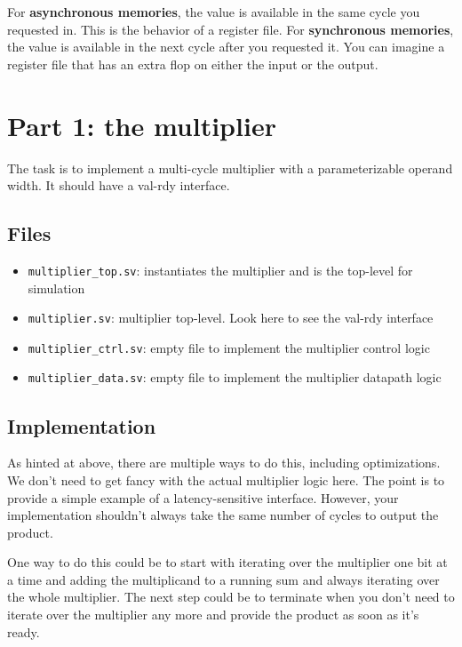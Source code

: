 \documentclass{article}
\begin{document}
For \textbf{asynchronous memories}, the value is available in the same cycle you
requested in. This is the behavior of a register file. For \textbf{synchronous
memories}, the value is available in the next cycle after you requested it. You
can imagine a register file that has an extra flop on either the input or the
output.

\section*{Part 1: the multiplier}
The task is to implement a multi-cycle multiplier with a parameterizable operand
width. It should have a val-rdy interface. 
\subsection*{Files}
\begin{itemize}
    \item \texttt{multiplier\_top.sv}: instantiates the multiplier and is the
    top-level for simulation
    \item \texttt{multiplier.sv}: multiplier top-level. Look here to see the
    val-rdy interface
    \item \texttt{multiplier\_ctrl.sv}: empty file to implement the multiplier
    control logic
    \item \texttt{multiplier\_data.sv}: empty file to implement the multiplier
    datapath logic
\end{itemize}

\subsection*{Implementation}
As hinted at above, there are multiple ways to do this, including optimizations.
We don't need to get fancy with the actual multiplier logic here. The point is
to provide a simple example of a latency-sensitive interface. However, your
implementation shouldn't always take the same number of cycles to output the
product.

One way to do this could be to start with iterating over the multiplier one bit
at a time and adding the multiplicand to a running sum and always iterating over
the whole multiplier. The next step could be to terminate when you don't need to
iterate over the multiplier any more and provide the product as soon as it's
ready. 
\end{document}
